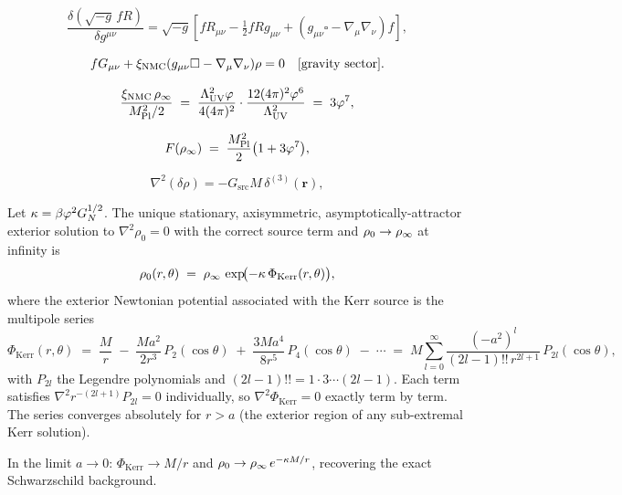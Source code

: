 \begin{equation}
  \frac{\delta(\sqrt{-g}\,f R)}{\delta g^{\mu\nu}}
  = \sqrt{-g}\!\left[f R_{\mu\nu} - \tfrac{1}{2}f R g_{\mu\nu}
    + (g_{\mu\nu}\square - \nabla_\mu\nabla_\nu)f\right],
  \label{P7:eq:var_fR}
\end{equation}

\begin{equation}
  f G_{\mu\nu} + \xi_{\mathrm{NMC}}(g_{\mu\nu}\square - \nabla_\mu\nabla_\nu)\rho = 0
  \quad[\text{gravity sector}].
  \label{P7:eq:gravity_sector}
\end{equation}

\begin{equation}
  \frac{\xi_{\mathrm{NMC}}\,\rho_{\infty}}{M_{\mathrm{Pl}}^2/2}
  \;=\; \frac{\Lambda_{\mathrm{UV}}^2\varphi}{4(4\pi)^2}\cdot\frac{12(4\pi)^2\varphi^6}{\Lambda_{\mathrm{UV}}^2}
  \;=\; 3\varphi^7,
  \label{P7:eq:NMC_ratio}
\end{equation}

\begin{equation}
  F(\rho_{\infty}) \;=\; \frac{M_{\mathrm{Pl}}^2}{2}\bigl(1+3\varphi^7\bigr),
  \label{P7:eq:Feff_derived}
\end{equation}

\begin{equation}
  \nabla^2(\delta\rho) = -G_{\mathrm{src}}M\,\delta^{(3)}(\mathbf{r}),
  \label{P7:eq:poisson}
\end{equation}

\begin{theorem}
\label{P7:thm:rotating}
Let $\kappa = \beta\varphi^2 G_N^{1/2}$.
The unique stationary, axisymmetric, asymptotically-attractor exterior
solution to $\nabla^2\rho_0 = 0$ with the correct source term and
$\rho_0\to\rho_{\infty}$ at infinity is
\begin{equation}
  \rho_0(r,\theta)
  \;=\; \rho_{\infty}\,\exp\!\bigl(-\kappa\,\Phi_{\mathrm{Kerr}}(r,\theta)\bigr),
  \label{P7:eq:rho_Kerr_exact}
\end{equation}
where the exterior Newtonian potential associated with the Kerr
source is the multipole series
\begin{equation}
  \boxed{\Phi_{\mathrm{Kerr}}(r,\theta)
  \;=\; \frac{M}{r}
  \;-\; \frac{M a^2}{2r^3}\,P_2(\cos\theta)
  \;+\; \frac{3M a^4}{8r^5}\,P_4(\cos\theta)
  \;-\; \cdots
  \;=\; M\sum_{l=0}^{\infty}
        \frac{(-a^2)^l}{(2l-1)!!\,r^{2l+1}}\,P_{2l}(\cos\theta),}
  \label{P7:eq:Phi_Kerr}
\end{equation}
with $P_{2l}$ the Legendre polynomials and $(2l-1)!! = 1\cdot3\cdots(2l-1)$.
Each term satisfies $\nabla^2 r^{-(2l+1)}P_{2l} = 0$ individually,
so $\nabla^2\Phi_{\mathrm{Kerr}} = 0$ exactly term by term.
The series converges absolutely for $r > a$ (the exterior region
of any sub-extremal Kerr solution).

In the limit $a\to0$: $\Phi_{\mathrm{Kerr}}\to M/r$ and
$\rho_0\to\rho_{\infty}\,e^{-\kappa M/r}$, recovering the exact
Schwarzschild background.
\end{theorem}

